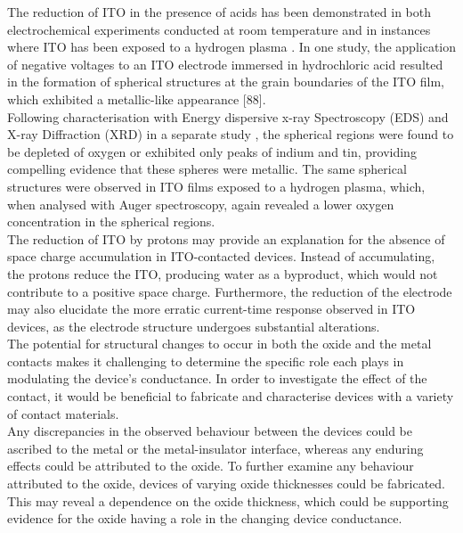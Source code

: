 \noindent The reduction of ITO in the presence of acids has been demonstrated in both electrochemical experiments conducted at room temperature \cite{wang2003optical} and in instances where ITO has been exposed to a hydrogen plasma \cite{banerjee1987degradation}. In one study, the application of negative voltages to an ITO electrode immersed in hydrochloric acid resulted in the formation of spherical structures at the grain boundaries of the ITO film, which exhibited a metallic-like appearance [88]. \\

\noindent Following characterisation with Energy dispersive x-ray Spectroscopy (EDS) \cite{huang2003electrochemical} and X-ray Diffraction (XRD) in a separate study \cite{liu2015important}, the spherical regions were found to be depleted of oxygen or exhibited only peaks of indium and tin, providing compelling evidence that these spheres were metallic. The same spherical structures were observed in ITO films exposed to a hydrogen plasma, which, when analysed with Auger spectroscopy, again revealed a lower oxygen concentration in the spherical regions.\\

\noindent The reduction of ITO by protons may provide an explanation for the absence of space charge accumulation in ITO-contacted devices. Instead of accumulating, the protons reduce the ITO, producing water as a byproduct, which would not contribute to a positive space charge. Furthermore, the reduction of the electrode may also elucidate the more erratic current-time response observed in ITO devices, as the electrode structure undergoes substantial alterations.\\

\noindent The potential for structural changes to occur in both the oxide and the metal contacts makes it challenging to determine the specific role each plays in modulating the device's conductance. In order to investigate the effect of the contact, it would be beneficial to fabricate and characterise devices with a variety of contact materials. \\

\noindent Any discrepancies in the observed behaviour between the devices could be ascribed to the metal or the metal-insulator interface, whereas any enduring effects could be attributed to the oxide. To further examine any behaviour attributed to the oxide, devices of varying oxide thicknesses could be fabricated. This may reveal a dependence on the oxide thickness, which could be supporting evidence for the oxide having a role in the changing device conductance. \\

